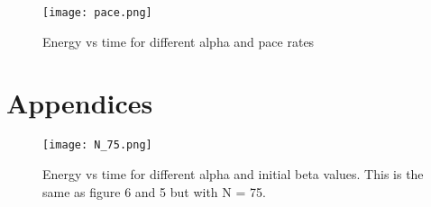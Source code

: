 \documentclass[a4paper]{article}
\begin{document}
\vspace{1cm}

\begin{figure}[H]
\centering
\texttt{[image: pace.png]}
\caption{\label{fig:part1}Energy vs time for different alpha and pace rates}
\end{figure}

\newpage
\appendix
\section{Appendices}

\begin{figure}[H]
\centering
\texttt{[image: N\_75.png]}
\caption{\label{fig:part1}Energy vs time for different alpha and initial beta values. This is the same as figure 6 and 5 but with N = 75.}
\end{figure}
\end{document}
